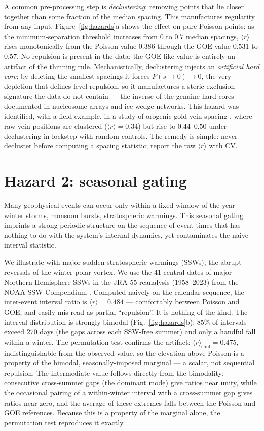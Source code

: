 \documentclass[11pt]{article}
\newcommand{\rr}{\langle r\rangle}
\begin{document}
A common pre-processing step is \emph{declustering}: removing points that lie
closer together than some fraction of the median spacing. This manufactures
regularity from any input. Figure~\ref{fig:hazards}a shows the effect on pure
Poisson points: as the minimum-separation threshold increases from $0$ to $0.7$
median spacings, $\rr$ rises monotonically from the Poisson value $0.386$ through
the GOE value $0.531$ to $0.57$. No repulsion is present in the data; the GOE-like
value is entirely an artifact of the thinning rule. Mechanistically,
declustering injects an \emph{artificial hard core}: by deleting the smallest
spacings it forces $P(s\!\to\!0)\to0$, the very depletion that defines level
repulsion, so it manufactures a steric-exclusion signature the data do not
contain --- the inverse of the genuine hard cores documented in nucleosome
arrays and ice-wedge networks. This hazard was identified,
with a field example, in a study of orogenic-gold vein spacing
\citep{chen2026sigma}, where raw vein positions are clustered ($\rr=0.34$) but
rise to $0.44$--$0.50$ under declustering in lockstep with random controls. The
remedy is simple: never decluster before computing a spacing statistic; report
the raw $\rr$ with CV.

\section{Hazard 2: seasonal gating}

Many geophysical events can occur only within a fixed window of the year ---
winter storms, monsoon bursts, stratospheric warmings. This seasonal gating
imprints a strong periodic structure on the sequence of event times that has
nothing to do with the system's internal dynamics, yet contaminates the naive
interval statistic.

We illustrate with major sudden stratospheric warmings (SSWs), the abrupt
reversals of the winter polar vortex. We use the 41 central dates of major
Northern-Hemisphere SSWs in the JRA-55 reanalysis (1958--2023) from the NOAA SSW
Compendium \citep{butler2017,charlton2007}. Computed naively on the calendar
sequence, the inter-event interval ratio is $\rr=0.484$ --- comfortably between
Poisson and GOE, and easily mis-read as partial ``repulsion''. It is nothing of
the kind. The interval distribution is strongly bimodal
(Fig.~\ref{fig:hazards}b): $85\%$ of intervals exceed $270$ days (the gaps across
each SSW-free summer) and only a handful fall within a winter. The permutation
test confirms the artifact: $\rr_{\mathrm{shuf}}=0.475$, indistinguishable from
the observed value, so the elevation above Poisson is a property of the bimodal,
seasonally-imposed marginal --- a scalar, not sequential repulsion. The
intermediate value follows directly from the bimodality: consecutive
cross-summer gaps (the dominant mode) give ratios near unity, while the
occasional pairing of a within-winter interval with a cross-summer gap gives
ratios near zero, and the average of these extremes falls between the Poisson and
GOE references. Because this is a property of the marginal alone, the permutation
test reproduces it exactly.
\end{document}
